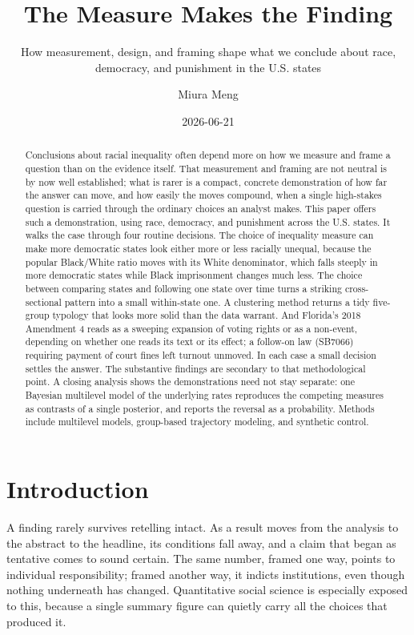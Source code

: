 \documentclass[
  12pt,
]{article}
\title{The Measure Makes the Finding}
\subtitle{How measurement, design, and framing shape what we conclude
about race, democracy, and punishment in the U.S. states}
\author{Miura Meng}
\date{2026-06-21}
\begin{document}
\maketitle
\begin{abstract}
Conclusions about racial inequality often depend more on how we measure
and frame a question than on the evidence itself. That measurement and
framing are not neutral is by now well established; what is rarer is a
compact, concrete demonstration of how far the answer can move, and how
easily the moves compound, when a single high-stakes question is carried
through the ordinary choices an analyst makes. This paper offers such a
demonstration, using race, democracy, and punishment across the U.S.
states. It walks the case through four routine decisions. The choice of
inequality measure can make more democratic states look either more or
less racially unequal, because the popular Black/White ratio moves with
its White denominator, which falls steeply in more democratic states
while Black imprisonment changes much less. The choice between comparing
states and following one state over time turns a striking
cross-sectional pattern into a small within-state one. A clustering
method returns a tidy five-group typology that looks more solid than the
data warrant. And Florida's 2018 Amendment 4 reads as a sweeping
expansion of voting rights or as a non-event, depending on whether one
reads its text or its effect; a follow-on law (SB7066) requiring payment
of court fines left turnout unmoved. In each case a small decision
settles the answer. The substantive findings are secondary to that
methodological point. A closing analysis shows the demonstrations need
not stay separate: one Bayesian multilevel model of the underlying rates
reproduces the competing measures as contrasts of a single posterior,
and reports the reversal as a probability. Methods include multilevel
models, group-based trajectory modeling, and synthetic control.
\end{abstract}


\newpage

\section{Introduction}\label{introduction}

A finding rarely survives retelling intact. As a result moves from the
analysis to the abstract to the headline, its conditions fall away, and
a claim that began as tentative comes to sound certain. The same number,
framed one way, points to individual responsibility; framed another way,
it indicts institutions, even though nothing underneath has changed.
Quantitative social science is especially exposed to this, because a
single summary figure can quietly carry all the choices that produced
it.
\end{document}
